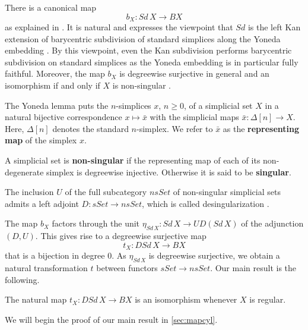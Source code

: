 There is a canonical map
\[b_X:Sd\, X\to BX\]
as explained in \cite[p.~37]{WJR13}. It is natural and expresses the viewpoint that $Sd$ is the left Kan extension of barycentric subdivision of standard simplices along the Yoneda embedding \cite[X.3~(10)]{ML98}. By this viewpoint, even the Kan subdivision performs barycentric subdivision on standard simplices \cite[X.3~Cor.~3]{ML98} as the Yoneda embedding is in particular fully faithful. Moreover, the map $b_X$ is degreewise surjective in general \cite[Lem.~2.2.10, p.~38]{WJR13} and an isomorphism if and only if $X$ is non-singular \cite[Lem.~2.2.11, p.~38]{WJR13}.

The Yoneda lemma puts the $n$-simplices $x$, $n\geq 0$, of a simplicial set $X$ in a natural bijective correspondence $x\mapsto \bar{x}$ with the simplicial maps $\bar{x} :\Delta [n]\to X$. Here, $\Delta [n]$ denotes the standard $n$-simplex. We refer to $\bar{x}$ as the \textbf{representing map} of the simplex $x$.
\begin{definition}
A simplicial set is \textbf{non-singular} if the representing map of each of its non-degenerate simplex is degreewise injective. Otherwise it is said to be \textbf{singular}.
\end{definition}
\noindent The inclusion $U$ of the full subcategory $nsSet$ of non-singular simplicial sets admits a left adjoint $D:sSet\to nsSet$, which is called desingularization \cite[Rem.~2.2.12]{WJR13}.

The map $b_X$ factors through the unit $\eta _{Sd\, X}:Sd\, X\to UD(Sd\, X)$ of the adjunction $(D,U)$. This gives rise to a degreewise surjective map
\[t_X:DSd\, X\to BX\]
that is a bijection in degree $0$. As $\eta _{Sd\, X}$ is degreewise surjective, we obtain a natural transformation $t$ between functors $sSet\to nsSet$. Our main result is the following.
\begin{theorem}\label{thm:main_opt_triang}
The natural map $t_X:DSd\, X\to BX$ is an isomorphism whenever $X$ is regular.
\end{theorem}
\noindent We will begin the proof of our main result in \cref{sec:mapcyl}.

